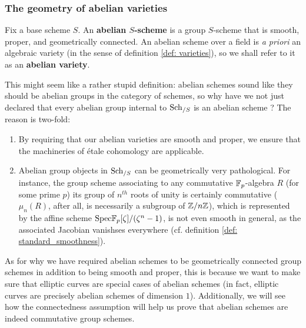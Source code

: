             \subsubsection{The geometry of abelian varieties}
                \begin{definition} \label{def: abelian_varieties}
                    Fix a base scheme $S$. An \textbf{abelian $S$-scheme} is a group $S$-scheme that is smooth, proper, and geometrically connected. An abelian scheme over a field is \textit{a priori} an algebraic variety (in the sense of definition \ref{def: varieties}), so we shall refer to it as an \textbf{abelian variety}.
                \end{definition}
                This might seem like a rather stupid definition: abelian schemes sound like they should be abelian groups in the category of schemes, so why have we not just declared that every abelian group internal to $\mathrm{Sch}_{/S}$ is an abelian scheme ? The reason is two-fold:
                    \begin{enumerate}
                        \item By requiring that our abelian varieties are smooth and proper, we ensure that the machineries of \'etale cohomology are applicable.
                        \item Abelian group objects in $\mathrm{Sch}_{/S}$ can be geometrically very pathological. For instance, the group scheme associating to any commutative $\mathbb{F}_p$-algebra $R$ (for some prime $p$) its group of $n^{th}$ roots of unity is certainly commutative ($\mu_n(R)$, after all, is necessarily a subgroup of $\mathbb{Z}/n\mathbb{Z}$), which is represented by the affine scheme $\mathrm{Spec} \mathbb{F}_p[\zeta]/(\zeta^n - 1)$, is not even smooth in general, as the associated Jacobian vanishses everywhere (cf. definition \ref{def: standard_smoothness}).
                    \end{enumerate}
                As for why we have required abelian schemes to be geometrically connected group schemes in addition to being smooth and proper, this is because we want to make sure that elliptic curves are special cases of abelian schemes (in fact, elliptic curves are precisely abelian schemes of dimension $1$). Additionally, we will see how the connectedness assumption will help us prove that abelian schemes are indeed commutative group schemes.
                

